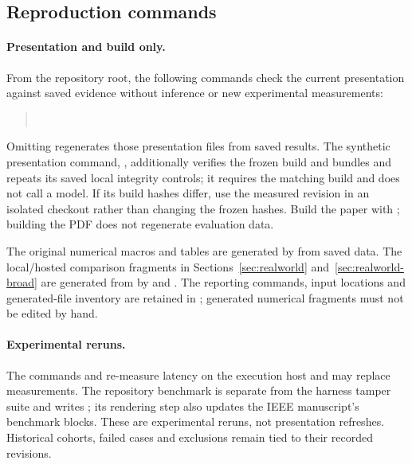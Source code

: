 \subsection{Reproduction commands}\label{app:reproduction-commands}

\paragraph{Presentation and build only.} From the repository root, the following commands check the current presentation against saved evidence without inference or new experimental measurements:
\begin{quote}\small
{}\\
\end{quote}
Omitting  regenerates those presentation files from saved results. The synthetic presentation command, , additionally verifies the frozen build and bundles and repeats its saved local integrity controls; it requires the matching build and does not call a model. If its build hashes differ, use the measured revision in an isolated checkout rather than changing the frozen hashes. Build the paper with ; building the PDF does not regenerate evaluation data.

The original numerical macros and tables are generated by  from saved  data. The local/hosted comparison fragments in Sections~\ref{sec:realworld} and~\ref{sec:realworld-broad} are generated from  by  and . The reporting commands, input locations and generated-file inventory are retained in ; generated numerical fragments must not be edited by hand.

\paragraph{Experimental reruns.} The commands  and  re-measure latency on the execution host and may replace measurements. The repository benchmark is separate from the harness tamper suite and writes ; its rendering step also updates the IEEE manuscript's benchmark blocks. These are experimental reruns, not presentation refreshes. Historical cohorts, failed cases and exclusions remain tied to their recorded revisions.
